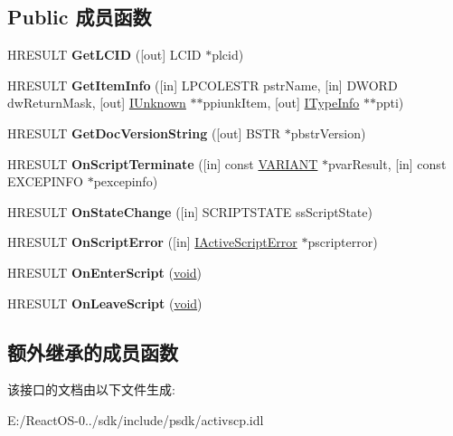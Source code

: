 \subsection*{Public 成员函数}
\begin{DoxyCompactItemize}
\item 
\mbox{\label{interface_i_active_script_site_a0420a0a76fd3813f5fc43dda4c46bd85}} 
H\+R\+E\+S\+U\+LT {\bfseries Get\+L\+C\+ID} (\mbox{[}out\mbox{]} L\+C\+ID $\ast$plcid)
\item 
\mbox{\label{interface_i_active_script_site_ac70f34abe21fcb4babc0f9464d27ffb6}} 
H\+R\+E\+S\+U\+LT {\bfseries Get\+Item\+Info} (\mbox{[}in\mbox{]} L\+P\+C\+O\+L\+E\+S\+TR pstr\+Name, \mbox{[}in\mbox{]} D\+W\+O\+RD dw\+Return\+Mask, \mbox{[}out\mbox{]} \hyperlink{interface_i_unknown}{I\+Unknown} $\ast$$\ast$ppiunk\+Item, \mbox{[}out\mbox{]} \hyperlink{interface_i_type_info}{I\+Type\+Info} $\ast$$\ast$ppti)
\item 
\mbox{\label{interface_i_active_script_site_a3bb100552b0a67a2185b36ecb128ef4a}} 
H\+R\+E\+S\+U\+LT {\bfseries Get\+Doc\+Version\+String} (\mbox{[}out\mbox{]} B\+S\+TR $\ast$pbstr\+Version)
\item 
\mbox{\label{interface_i_active_script_site_aa611606eae0d3f4e213eb72920cb1f85}} 
H\+R\+E\+S\+U\+LT {\bfseries On\+Script\+Terminate} (\mbox{[}in\mbox{]} const \hyperlink{structtag_v_a_r_i_a_n_t}{V\+A\+R\+I\+A\+NT} $\ast$pvar\+Result, \mbox{[}in\mbox{]} const E\+X\+C\+E\+P\+I\+N\+FO $\ast$pexcepinfo)
\item 
\mbox{\label{interface_i_active_script_site_adaad7d5bd8037f4468da53153ae6267e}} 
H\+R\+E\+S\+U\+LT {\bfseries On\+State\+Change} (\mbox{[}in\mbox{]} S\+C\+R\+I\+P\+T\+S\+T\+A\+TE ss\+Script\+State)
\item 
\mbox{\label{interface_i_active_script_site_a794e57e6c2f59ab2e8005155317f96c5}} 
H\+R\+E\+S\+U\+LT {\bfseries On\+Script\+Error} (\mbox{[}in\mbox{]} \hyperlink{interface_i_active_script_error}{I\+Active\+Script\+Error} $\ast$pscripterror)
\item 
\mbox{\label{interface_i_active_script_site_a26eac672dc578849ca78b53e735af3d0}} 
H\+R\+E\+S\+U\+LT {\bfseries On\+Enter\+Script} (\hyperlink{interfacevoid}{void})
\item 
\mbox{\label{interface_i_active_script_site_ae7e85fb8416e67f57086295bbfbc4308}} 
H\+R\+E\+S\+U\+LT {\bfseries On\+Leave\+Script} (\hyperlink{interfacevoid}{void})
\end{DoxyCompactItemize}
\subsection*{额外继承的成员函数}


该接口的文档由以下文件生成\+:\begin{DoxyCompactItemize}
\item 
E\+:/\+React\+O\+S-\/0../sdk/include/psdk/activscp.\+idl\end{DoxyCompactItemize}
